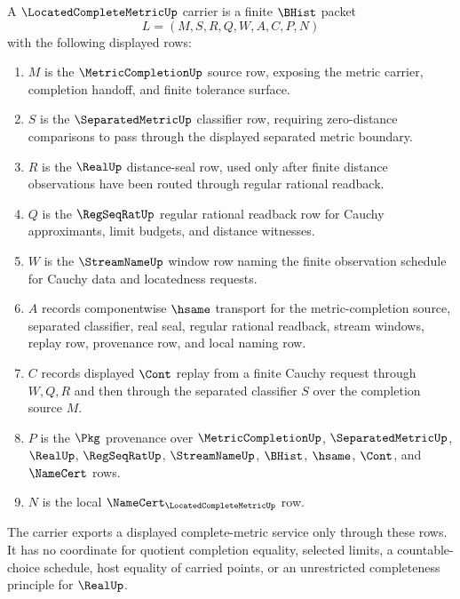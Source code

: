 \begin{definition}\label{def:located-complete-metric-carrier}
A $\LocatedCompleteMetricUp$ carrier is a finite $\BHist$ packet
$$
L=(M,S,R,Q,W,A,C,P,N)
$$
with the following displayed rows:
\begin{enumerate}
\item $M$ is the $\MetricCompletionUp$ source row, exposing the metric carrier, completion handoff, and finite tolerance surface.
\item $S$ is the $\SeparatedMetricUp$ classifier row, requiring zero-distance comparisons to pass through the displayed separated metric boundary.
\item $R$ is the $\RealUp$ distance-seal row, used only after finite distance observations have been routed through regular rational readback.
\item $Q$ is the $\RegSeqRatUp$ regular rational readback row for Cauchy approximants, limit budgets, and distance witnesses.
\item $W$ is the $\StreamNameUp$ window row naming the finite observation schedule for Cauchy data and locatedness requests.
\item $A$ records componentwise $\hsame$ transport for the metric-completion source, separated classifier, real seal, regular rational readback, stream windows, replay row, provenance row, and local naming row.
\item $C$ records displayed $\Cont$ replay from a finite Cauchy request through $W,Q,R$ and then through the separated classifier $S$ over the completion source $M$.
\item $P$ is the $\Pkg$ provenance over $\MetricCompletionUp$, $\SeparatedMetricUp$, $\RealUp$, $\RegSeqRatUp$, $\StreamNameUp$, $\BHist$, $\hsame$, $\Cont$, and $\NameCert$ rows.
\item $N$ is the local $\NameCert_{\LocatedCompleteMetricUp}$ row.
\end{enumerate}
The carrier exports a displayed complete-metric service only through these rows. It has no coordinate for quotient completion equality, selected limits, a countable-choice schedule, host equality of carried points, or an unrestricted completeness principle for $\RealUp$.
\end{definition}

